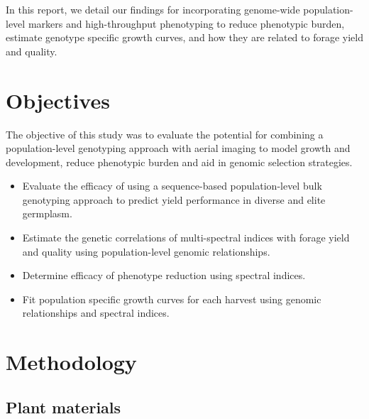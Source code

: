 \documentclass[12pt, letterpaper]{article}
\begin{document}


In this report, we detail our findings for incorporating genome-wide population-level markers and high-throughput phenotyping to reduce phenotypic burden, estimate genotype specific growth curves, and how they are related to forage yield and quality. 

\section*{Objectives}

The objective of this study was to evaluate the potential for combining a population-level genotyping approach with aerial imaging to model growth and development, reduce phenotypic burden and aid in genomic selection strategies. 

\begin{itemize}
	  \setlength\itemsep{0.2em}
	\item Evaluate the efficacy of using a sequence-based population-level bulk genotyping approach to predict yield performance in diverse and elite germplasm.

	\item Estimate the genetic correlations of multi-spectral indices with forage yield and quality using population-level genomic relationships. 

	\item Determine efficacy of phenotype reduction using spectral indices.
	
	\item Fit population specific growth curves for each harvest using genomic relationships and spectral indices. 
\end{itemize}



\section*{Methodology}

\subsection{Plant materials}
\end{document}

